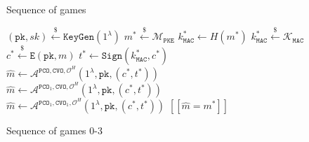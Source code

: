 \documentclass{article}
\newcommand{\monospace}{\texttt}
\newcommand{\pke}{\monospace{PKE}}
\newcommand{\keygen}{\monospace{KeyGen}}
\newcommand{\encrypt}{\monospace{E}}
\newcommand{\mac}{\monospace{MAC}}
\newcommand{\sign}{\monospace{Sign}}
\newcommand{\pk}{\monospace{pk}}
\newcommand{\pco}{\monospace{PCO}}
\newcommand{\cvo}{\monospace{CVO}}
\newcommand{\leftsample}{\stackrel{\$}{\leftarrow}}
\newcommand{\llbrack}{[\![}
\newcommand{\rrbrack}{]\!]}
\begin{document}
\begin{figure}[H]
    \center

    \begin{algorithm}[H]
        \caption{Sequence of games}\label{alg:sequence-of-games}

        \begin{algorithmic}
            \State $(\pk, sk) \leftsample \keygen(1^\lambda)$
            \State $m^\ast \leftsample \mathcal{M}_\pke$
            \State $k^\ast_\mac \leftarrow H(m^\ast)$
            \State $k^\ast_\mac \leftsample \mathcal{K}_\mac$
            \State $c^\ast \leftsample \encrypt(\pk, m)$
            \State $t^\ast \leftarrow \sign(k^\ast_\mac, c^\ast)$
            \State $
                \hat{m} \leftarrow 
                \mathcal{A}^{
                    \pco, \cvo, \mathcal{O}^H
                }(1^\lambda, \pk, (c^\ast, t^\ast))
            $
            \State $
                \hat{m} \leftarrow 
                \mathcal{A}^{
                    \pco_1, \cvo, \mathcal{O}^H
                }(1^\lambda, \pk, (c^\ast, t^\ast))
            $
            \State $
                \hat{m} \leftarrow 
                \mathcal{A}^{
                    \pco_1, \cvo_1, \mathcal{O}^H
                }(1^\lambda, \pk, (c^\ast, t^\ast))
            $
            \State \Return $\llbrack \hat{m} = m^\ast \rrbrack$
        \end{algorithmic}
    \end{algorithm}

    \caption{Sequence of games 0-3}\label{fig:sequence-of-games}
\end{figure}
\end{document}
